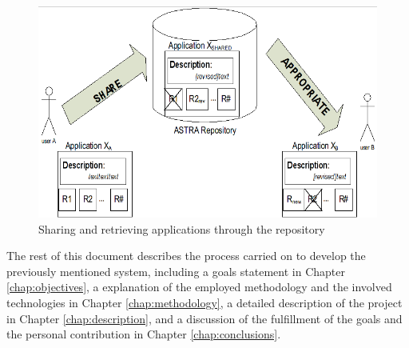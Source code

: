 \begin{figure}[h!]
 \begin{center}
 \includegraphics[scale=0.4]{screenshots/repository-appropiation.png}
  \caption{\label{img:astra-repository}Sharing and retrieving
  applications through the repository}
 \end{center}
\end{figure}

The rest of this document describes the process carried on to develop the
previously mentioned system, including a goals statement in Chapter
\ref{chap:objectives}, a explanation of the employed methodology and the
involved technologies in Chapter \ref{chap:methodology}, a detailed description
of the project in Chapter \ref{chap:description}, and a discussion of the
fulfillment of the goals and the personal contribution in Chapter
\ref{chap:conclusions}. 